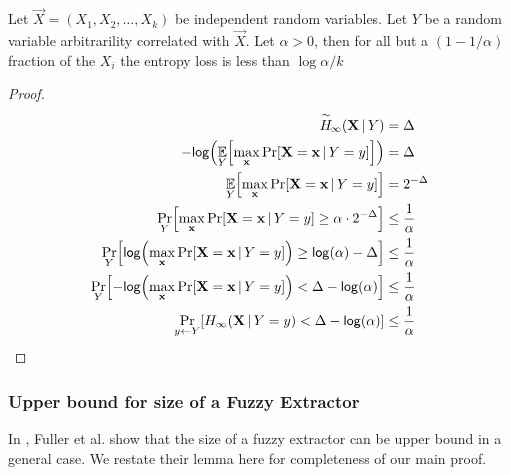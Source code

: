 
\begin{lemma}
    \label{lem:markovpred}
    Let $\vec{X} = (X_1, X_2, \ldots, X_k)$ be independent random variables. Let $Y$ be a random variable arbitrarility correlated with $\vec{X}$. 
    Let $\alpha > 0$, then for all but a $(1-1/\alpha)$ fraction of the $X_i$ the entropy loss is less than $\log{\alpha}/k$
\end{lemma}

\begin{proof} 

\begin{align}
    \acminent{\vec{X}}{Y} &= \Delta\\
    -\log{\Exlim{Y}{\max\limits_{\vec{x}} \Prob{\Vec{X} = \vec{x} \,|\, Y = y}}} &= \Delta\\
    \Exlim{Y}{\max\limits_{\vec{x}} \Prob{\Vec{X} = \vec{x} \,|\, Y = y}} &= 2^{-\Delta}\\
    \Problim{Y}{\max\limits_{\vec{x}} \Prob{\Vec{X} = \vec{x} \,|\, Y = y} \geq \alpha \cdot 2^{-\Delta}} &\leq \frac{1}{\alpha} \\
    \Problim{Y}{\log{\max\limits_{\vec{x}} \Prob{\Vec{X} = \vec{x} \,|\, Y = y}} \geq \log{\alpha} -\Delta} &\leq \frac{1}{\alpha} \\
    \Problim{Y}{-\log{\max\limits_{\vec{x}} \Prob{\Vec{X} = \vec{x} \,|\, Y = y}} < \Delta -\log{\alpha}} &\leq \frac{1}{\alpha} \\
    \Problim{y\leftarrow Y}{\minent{\vec{X}\, |\, Y=y} < \Delta -\log{\alpha}} &\leq \frac{1}{\alpha}
\end{align}
    
\end{proof}

\subsubsection{Upper bound for size of a Fuzzy Extractor}
In \cite{fuller2020fuzzy}, Fuller et al. show that the size of a fuzzy extractor can be upper bound in a general case. 
We restate their lemma here for completeness of our main proof. 

